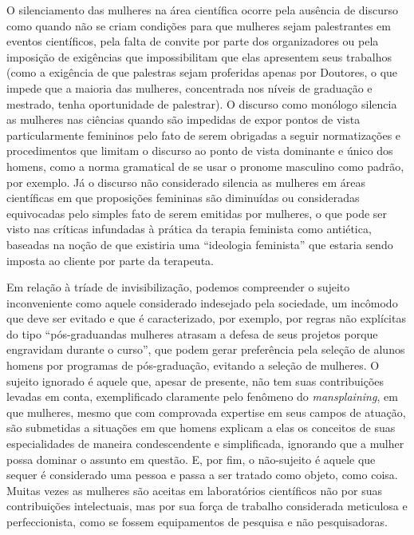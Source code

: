 O silenciamento das mulheres na área científica ocorre pela ausência de discurso como quando não se criam condições para que mulheres sejam palestrantes em eventos científicos, pela falta de convite por parte dos organizadores ou pela imposição de exigências que impossibilitam que elas apresentem seus trabalhos (como a exigência de que palestras sejam proferidas apenas por Doutores, o que impede que a maioria das mulheres, concentrada nos níveis de graduação e mestrado, tenha oportunidade de palestrar). O discurso como monólogo silencia as mulheres nas ciências quando são impedidas de expor pontos de vista particularmente femininos pelo fato de serem obrigadas a seguir normatizações e procedimentos que limitam o discurso ao ponto de vista dominante e único dos homens, como a norma gramatical de se usar o pronome masculino como padrão, por exemplo. Já o discurso não considerado silencia as mulheres em áreas científicas em que proposições femininas são diminuídas ou consideradas equivocadas pelo simples fato de serem emitidas por mulheres, o que pode ser visto nas críticas infundadas à prática da terapia feminista como antiética, baseadas na noção de que existiria uma ``ideologia feminista'' que estaria sendo imposta ao cliente por parte da terapeuta.

Em relação à tríade de invisibilização, podemos compreender o sujeito inconveniente como aquele considerado indesejado pela sociedade, um incômodo que deve ser evitado e que é caracterizado, por exemplo, por regras não explícitas do tipo ``pós-graduandas mulheres atrasam a defesa de seus projetos porque engravidam durante o curso'', que podem gerar preferência pela seleção de alunos homens por programas de pós-graduação, evitando a seleção de mulheres. O sujeito ignorado é aquele que, apesar de presente, não tem suas contribuições levadas em conta, exemplificado claramente pelo fenômeno do \textit{mansplaining}, em que mulheres, mesmo que com comprovada expertise em seus campos de atuação, são submetidas a situações em que homens explicam a elas os conceitos de suas especialidades de maneira condescendente e simplificada, ignorando que a mulher possa dominar o assunto em questão. E, por fim, o não-sujeito é aquele que sequer é considerado uma pessoa e passa a ser tratado como objeto, como coisa. Muitas vezes as mulheres são aceitas em laboratórios científicos não por suas contribuições intelectuais, mas por sua força de trabalho considerada meticulosa e perfeccionista, como se fossem equipamentos de pesquisa e não pesquisadoras.


